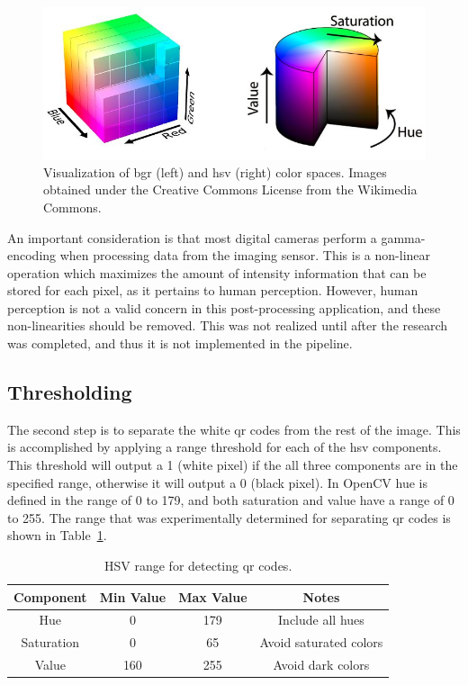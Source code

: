 \begin{figure}
	\centering
    \includegraphics[width=5.5in]{figures/bgr_and_hsv.jpg}
    \caption[BGR and HSV color spaces]{Visualization of \ac{bgr} (left) and \ac{hsv} (right) color spaces. Images obtained under the Creative Commons License from the Wikimedia Commons.}
    \label{figure:color_spaces}
\end{figure} 

An important consideration is that most digital cameras perform a gamma-encoding when processing data from the imaging sensor.  This is a non-linear operation which maximizes the amount of intensity information that can be stored for each pixel, as it pertains to human perception.  However, human perception is not a valid concern in this post-processing application, and these non-linearities should be removed.  This was not realized until after the research was completed, and thus it is not implemented in the pipeline.

\subsection{Thresholding}
\label{section:qr_thresholding}

The second step is to separate the white \ac{qr} codes from the rest of the image.  This is accomplished by applying a range threshold for each of the \ac{hsv} components.  This threshold will output a 1 (white pixel) if the all three components are in the specified range, otherwise it will output a 0 (black pixel).  In OpenCV hue is defined in the range of 0 to 179, and both saturation and value have a range of 0 to 255.  The range that was experimentally determined for separating \ac{qr} codes is shown in Table~\ref{table:qr_hsv_ranges}.

\begin{table}
    \begin{center}
    \caption[QR code detection values]{HSV range for detecting \ac{qr} codes.}
    \begin{tabular}[c]{|c|c|c|c|}
        \hline
        Component & Min Value & Max Value & Notes \\
        \hline
        Hue        & 0   & 179 & Include all hues      \\
        Saturation & 0   & 65  & Avoid saturated colors  \\
        Value      & 160 & 255 & Avoid dark colors       \\
        \hline
    \end{tabular}
    \label{table:qr_hsv_ranges}
   \end{center}
\end{table}

